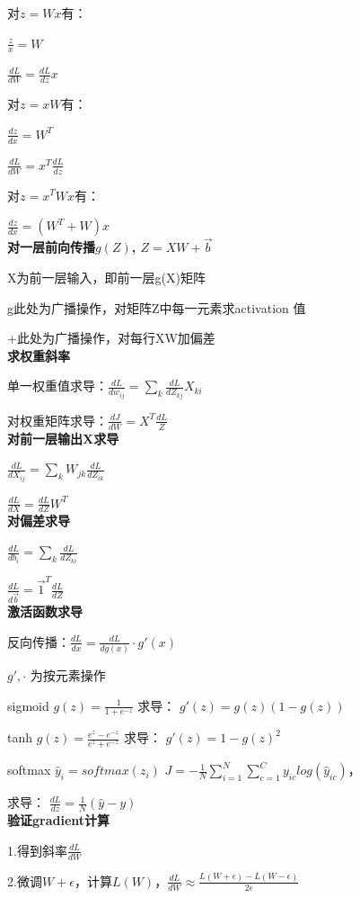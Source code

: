 \documentclass[UTF8]{ctexart}
\begin{document}
  对$z = Wx$有：
  
  \quad $\frac{z}{x} = W$
  
  \quad $\frac{dL}{dW} = \frac{dL}{dz}x$

  对$z = xW$有：
  
  \quad $\frac{dz}{dx} = W^T$

  \quad $\frac{dL}{dW} = x^T\frac{dL}{dz}$
  
  对$z = x^TWx$有：
  
  \quad $\frac{dz}{dx} = (W^T + W)x$\\
\textbf{对一层前向传播$g(Z)$, $Z = XW + \vec{b}$}

  X为前一层输入，即前一层g(X)矩阵
  
  g此处为广播操作，对矩阵Z中每一元素求activation 值
  
  +此处为广播操作，对每行XW加偏差\\
\textbf{求权重斜率}
  
  单一权重值求导：$\frac{dL}{dw_{ij}} = \sum_k \frac{dL}{dZ_{kj}} X_{ki}$

  对权重矩阵求导：$\frac{dJ}{dW} = X^T\frac{dL}{Z}$\\
\textbf{对前一层输出X求导}

  $\frac{dL}{dX_{ij}} = \sum_k W_{jk}\frac{dL}{dZ_{ik}}$

  $\frac{dL}{dX} = \frac{dL}{dZ}W^T$\\
\textbf{对偏差求导}

  $\frac{dL}{db_i} = \sum_k \frac{dL}{dZ_{ki}}$

  $\frac{dL}{d\vec{b}} = \vec{1}^T\frac{dL}{dZ}$\\
\textbf{激活函数求导}

  反向传播：$\frac{dL}{dx} = \frac{dL}{dg(x)} \cdot g'(x)$
  
  \quad $g', \cdot$ 为按元素操作

  sigmoid $g(z) = \frac{1}{1 + e^{-z}}$ 求导： $g'(z) = g(z)(1 - g(z))$

  tanh $g(z) = \frac{e^z - e^{-z}}{e^z + e^{-z}}$ 求导： $g'(z) = 1 - g(z)^2$

  softmax $\hat{y}_i = softmax(z_i)$ $J = -\frac{1}{N}\sum_{i=1}^{N}\sum_{c=1}^{C}y_{ic}log(\hat{y}_{ic})$，
  
  \quad 求导： $\frac{dL}{dz} = \frac{1}{N}(\hat{y} - y)$\\
\textbf{验证gradient计算}

  1.得到斜率$\frac{dL}{dW}$

  2.微调$W + \epsilon$，计算$L(W)$，$\frac{dL}{dW} \approx \frac{L(W + \epsilon) - L(W - \epsilon)}{2\epsilon}$
\end{document}

